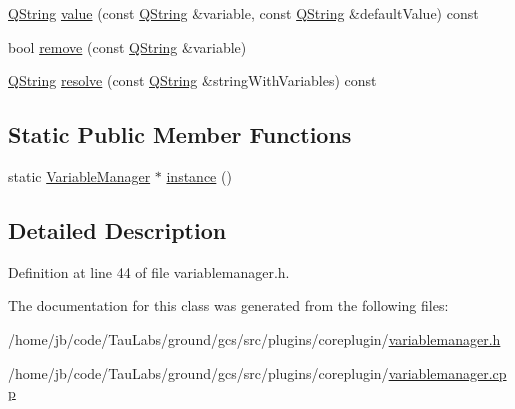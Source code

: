 \begin{DoxyCompactItemize}
\item 
\hyperlink{group___u_a_v_objects_plugin_gab9d252f49c333c94a72f97ce3105a32d}{\-Q\-String} \hyperlink{group___core_plugin_ga00675704f052101b23ad697bd13935ea}{value} (const \hyperlink{group___u_a_v_objects_plugin_gab9d252f49c333c94a72f97ce3105a32d}{\-Q\-String} \&variable, const \hyperlink{group___u_a_v_objects_plugin_gab9d252f49c333c94a72f97ce3105a32d}{\-Q\-String} \&default\-Value) const 
\item 
bool \hyperlink{group___core_plugin_gae2a894223982b2023accbac9cbe8d692}{remove} (const \hyperlink{group___u_a_v_objects_plugin_gab9d252f49c333c94a72f97ce3105a32d}{\-Q\-String} \&variable)
\item 
\hyperlink{group___u_a_v_objects_plugin_gab9d252f49c333c94a72f97ce3105a32d}{\-Q\-String} \hyperlink{group___core_plugin_ga8b0765d1c6a498f76463b945923c5f6e}{resolve} (const \hyperlink{group___u_a_v_objects_plugin_gab9d252f49c333c94a72f97ce3105a32d}{\-Q\-String} \&string\-With\-Variables) const 
\end{DoxyCompactItemize}
\subsection*{\-Static \-Public \-Member \-Functions}
\begin{DoxyCompactItemize}
\item 
static \hyperlink{class_core_1_1_variable_manager}{\-Variable\-Manager} $\ast$ \hyperlink{group___core_plugin_ga5575bf0907e2289b7960fb10ce13dc95}{instance} ()
\end{DoxyCompactItemize}


\subsection{\-Detailed \-Description}


\-Definition at line 44 of file variablemanager.\-h.



\-The documentation for this class was generated from the following files\-:\begin{DoxyCompactItemize}
\item 
/home/jb/code/\-Tau\-Labs/ground/gcs/src/plugins/coreplugin/\hyperlink{variablemanager_8h}{variablemanager.\-h}\item 
/home/jb/code/\-Tau\-Labs/ground/gcs/src/plugins/coreplugin/\hyperlink{variablemanager_8cpp}{variablemanager.\-cpp}\end{DoxyCompactItemize}
